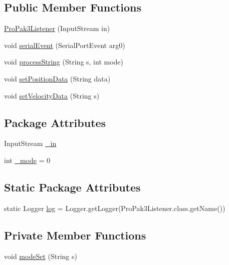 \subsection*{Public Member Functions}
\begin{DoxyCompactItemize}
\item 
\hyperlink{classrob_o_s2_1_1hardware_1_1novatel_1_1propak3_1_1_pro_pak3_listener_ac65bc578f3cb296235a33f76c5f5d22e}{ProPak3Listener} (InputStream in)
\item 
void \hyperlink{classrob_o_s2_1_1hardware_1_1novatel_1_1propak3_1_1_pro_pak3_listener_ada1051fa1103cac4f0f1fdd349f83e1b}{serialEvent} (SerialPortEvent arg0)
\item 
void \hyperlink{classrob_o_s2_1_1hardware_1_1novatel_1_1propak3_1_1_pro_pak3_listener_a3359485107edaf9214aeb65772de4121}{processString} (String s, int mode)
\item 
void \hyperlink{classrob_o_s2_1_1hardware_1_1novatel_1_1propak3_1_1_pro_pak3_listener_a518ddf185db61a68386f10eecc07d0a7}{setPositionData} (String data)
\item 
void \hyperlink{classrob_o_s2_1_1hardware_1_1novatel_1_1propak3_1_1_pro_pak3_listener_ad568c719fbbe10cbf303ff284a183cd5}{setVelocityData} (String s)
\end{DoxyCompactItemize}
\subsection*{Package Attributes}
\begin{DoxyCompactItemize}
\item 
InputStream \hyperlink{classrob_o_s2_1_1hardware_1_1novatel_1_1propak3_1_1_pro_pak3_listener_a14e32e6b6e65b49a48a0516d7b89ec30}{\_\-in}
\item 
int \hyperlink{classrob_o_s2_1_1hardware_1_1novatel_1_1propak3_1_1_pro_pak3_listener_a5c823b5e0bdf0b1b0b42d8a41d5e2683}{\_\-mode} = 0
\end{DoxyCompactItemize}
\subsection*{Static Package Attributes}
\begin{DoxyCompactItemize}
\item 
static Logger \hyperlink{classrob_o_s2_1_1hardware_1_1novatel_1_1propak3_1_1_pro_pak3_listener_a565ec13051b6c6e2f12212c399e75378}{log} = Logger.getLogger(ProPak3Listener.class.getName())
\end{DoxyCompactItemize}
\subsection*{Private Member Functions}
\begin{DoxyCompactItemize}
\item 
void \hyperlink{classrob_o_s2_1_1hardware_1_1novatel_1_1propak3_1_1_pro_pak3_listener_a4cb920f415901bde4108caf87824f8a2}{modeSet} (String s)
\end{DoxyCompactItemize}
